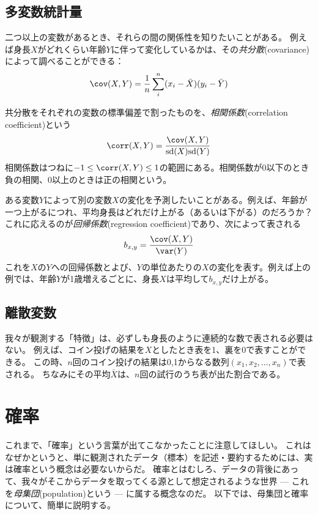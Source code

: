 \documentclass{jsarticle}
\begin{document}
\subsection{多変数統計量}
二つ以上の変数があるとき、それらの間の関係性を知りたいことがある。
例えば身長$X$がどれくらい年齢$Y$に伴って変化しているかは、その\emph{共分散}(covariance)によって調べることができる：
\[
 \cov(X, Y) = \frac{1}{n} \sum_i^n (x_i - \bar{X})(y_i - \bar{Y})
\]

共分散をそれぞれの変数の標準偏差で割ったものを、\emph{相関係数}(correlation coefficient)という
\[
 \corr(X, Y) = \frac{\cov(X, Y)}{\textrm{sd}(X) \textrm{sd}(Y)}
\]
相関係数はつねに$-1 \leq \corr(X,Y) \leq 1$の範囲にある。相関係数が0以下のとき負の相関、0以上のときは正の相関という。

ある変数$Y$によって別の変数$X$の変化を予測したいことがある。例えば、年齢が一つ上がるにつれ、平均身長はどれだけ上がる（あるいは下がる）のだろうか？
これに応えるのが\emph{回帰係数}(regression coefficient)であり、次によって表される
\[
 b_{x,y} = \frac{\cov(X,Y)}{\var(Y)}
\]
これを$X$の$Y$への回帰係数とよび、$Y$の単位あたりの$X$の変化を表す。例えば上の例では、年齢$Y$が1歳増えるごとに、身長$X$は平均して$b_{x,y}$だけ上がる。



\subsection{離散変数}
我々が観測する「特徴」は、必ずしも身長のように連続的な数で表される必要はない。
例えば、コイン投げの結果を$X$としたとき表を1、裏を0で表すことができる。
この時、$n$回のコイン投げの結果は0,1からなる数列$(x_1, x_2, \dots, x_n)$で表される。
ちなみにその平均$\bar{X}$は、$n$回の試行のうち表が出た割合である。




\section{確率}
これまで、「確率」という言葉が出てこなかったことに注意してほしい。
これはなぜかというと、単に観測されたデータ（標本）を記述・要約するためには、実は確率という概念は必要ないからだ。
確率とはむしろ、データの背後にあって、我々がそこからデータを取ってくる源として想定されるような世界 --- これを\emph{母集団}(population)という --- に属する概念なのだ。
以下では、母集団と確率について、簡単に説明する。
\end{document}
